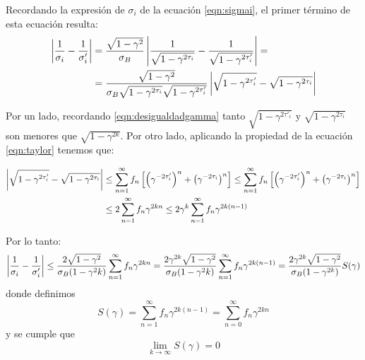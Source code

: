 

Recordando la expresión de $\sigma_i$ de la ecuación \eqref{eqn:sigmai}, el primer término de esta ecuación resulta:
\begin{align}
\nonumber   \left|\frac{1}{\sigma_i} - \frac{1}{\sigma_i'}\right| &= \frac{\sqrt{1-\gamma^2}}{\sigma_B}
    \left| \frac{1}{\sqrt{1-\gamma^{2\tau_i}}} - \frac{1}{\sqrt{1-\gamma^{2\tau'_i}}} \right| = \\
     &=\frac{\sqrt{1-\gamma^2}}{\sigma_B \sqrt{1-\gamma^{2\tau_i}} \sqrt{1-\gamma^{2\tau'_i}} }
    \left| \sqrt{1-\gamma^{2\tau'_i}} - \sqrt{1-\gamma^{2\tau_i} }\right|
    \label{eqn:diffsigma}
\end{align}

Por un lado, recordando \eqref{eqn:desigualdadgamma} tanto $\sqrt{1-\gamma^{2\tau'_i}}$ y $\sqrt{1-\gamma^{2\tau_i} }$ son menores que $\sqrt{1-\gamma^{2k} }$. 
Por otro lado, aplicando la propiedad de la ecuación \eqref{eqn:taylor} tenemos que:

\begin{align}
    \left| \sqrt{1-\gamma^{2\tau'_i}} - \sqrt{1-\gamma^{2\tau_i} } \right| & \leq
    \sum_{n=1}^\infty f_n \left[ \left( \gamma^{-2\tau'_i}\right)^n + 
    \left( \gamma^{-2\tau_i}\right)^n  \right] \leq
    \sum_{n=1}^\infty f_n \left[ \left( \gamma^{-2\tau'_i}\right)^n + 
    \left( \gamma^{-2\tau_i}\right)^n  \right] \\
    & \leq 2 \sum_{n=1}^\infty f_n \gamma^{2kn} \leq 2 \gamma^{k} \sum_{n=1}^\infty f_n \gamma^{2k(n-1)} 
\end{align}

Por lo tanto:
\begin{equation}
  \left|\frac{1}{\sigma_i} - \frac{1}{\sigma_i'}\right| \leq \frac{2 \sqrt{1-\gamma^{2}}}{\sigma_B (1-\gamma^2k)} \sum_{n=1}^\infty f_n \gamma^{2kn} = \frac{2 \gamma^{2k} \sqrt{1-\gamma^{2}}}{\sigma_B (1-\gamma^2k)} \sum_{n=1}^\infty f_n \gamma^{2k(n-1)} =
  \frac{2 \gamma^{2k} \sqrt{1-\gamma^{2}}}{\sigma_B (1-\gamma^{2k})} S(\gamma)
  \label{eqn:diffinvsigma}
\end{equation}
donde definimos
\begin{equation}
    S(\gamma) = \sum_{n=1}^\infty f_n \gamma^{2k(n-1)} = \sum_{n=0}^\infty f_n \gamma^{2kn}
\end{equation}
y se cumple que 
\begin{equation}
    \lim_{k\rightarrow\infty} S(\gamma) = 0
    \label{eqn:limiteS}
\end{equation}

